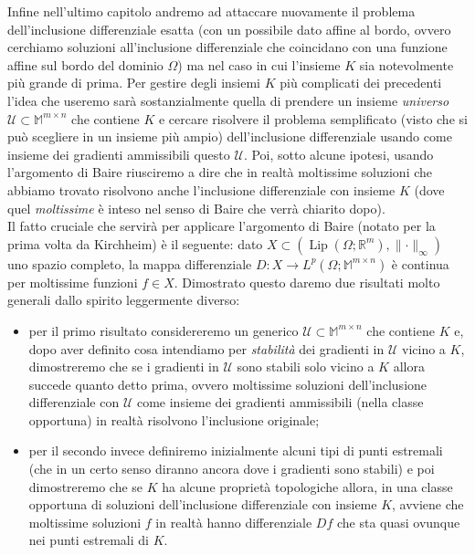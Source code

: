 \documentclass[a4paper,11pt]{book}
\theoremstyle{plain}
\theoremstyle{definition}
\theoremstyle{remark}
\newcommand{\R}{\mathbb{R}}
\newcommand{\M}{\mathbb{M}}
\newcommand{\norm}[1]{\lVert#1\rVert}
\DeclareMathOperator{\Lip}{Lip}
\begin{document}
Infine nell'ultimo capitolo andremo ad attaccare nuovamente il problema dell'inclusione differenziale esatta (con un possibile dato affine al bordo, ovvero cerchiamo soluzioni all'inclusione differenziale che coincidano con una funzione affine sul bordo del dominio $\Omega$) ma nel caso in cui l'insieme $K$ sia notevolmente più grande di prima. Per gestire degli insiemi $K$ più complicati dei precedenti l'idea che useremo sarà sostanzialmente quella di prendere un insieme \textit{universo} $\mathcal{U}\subset \M^{m\times n}$ che contiene $K$ e cercare risolvere il problema semplificato (visto che si può scegliere in un insieme più ampio) dell'inclusione differenziale usando come insieme dei gradienti ammissibili questo $\mathcal{U}$. Poi, sotto alcune ipotesi, usando l'argomento di Baire riusciremo a dire che in realtà moltissime soluzioni che abbiamo trovato risolvono anche l'inclusione differenziale con insieme $K$ (dove quel \textit{moltissime} è inteso nel senso di Baire che verrà chiarito dopo).\\
Il fatto cruciale che servirà per applicare l'argomento di Baire (notato per la prima volta da Kirchheim) è il seguente: dato $X\subset (\Lip(\Omega;\R^{m}),\norm{\cdot}_{\infty})$ uno spazio completo, la mappa differenziale $D:X\to L^{p}(\Omega;\M^{m\times n})$ è continua per moltissime funzioni $f\in X$. Dimostrato questo daremo due risultati molto generali dallo spirito leggermente diverso:
\begin{itemize}
	\item per il primo risultato considereremo un generico $\mathcal{U}\subset\M^{m\times n}$ che contiene $K$ e, dopo aver definito cosa intendiamo per \textit{stabilità} dei gradienti in $\mathcal{U}$ vicino a $K$, dimostreremo che se i gradienti in $\mathcal{U}$ sono stabili solo vicino a $K$ allora succede quanto detto prima, ovvero moltissime soluzioni dell'inclusione differenziale con $\mathcal{U}$ come insieme dei gradienti ammissibili (nella classe opportuna) in realtà risolvono l'inclusione originale;
	\item per il secondo invece definiremo inizialmente alcuni tipi di punti estremali (che in un certo senso diranno ancora dove i gradienti sono stabili) e poi dimostreremo che se $K$ ha alcune proprietà topologiche allora, in una classe opportuna di soluzioni dell'inclusione differenziale con insieme $K$, avviene che moltissime soluzioni $f$ in realtà hanno differenziale $Df$ che sta quasi ovunque nei punti estremali di $K$.
\end{itemize}
\end{document}

